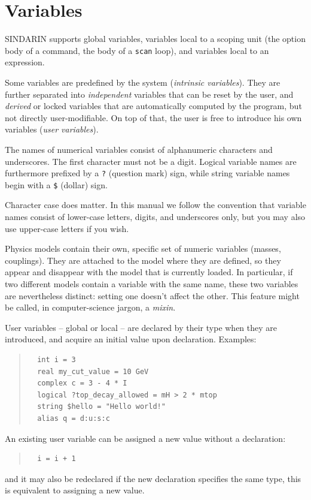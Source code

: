 \documentclass[12pt]{book}
\newcommand{\ttt}[1]{\texttt{#1}}
\begin{document}
\section{Variables}
\label{sec:variables}

SINDARIN supports global variables, variables local to a scoping unit (the
option body of a command, the body of a \ttt{scan} loop), and variables local
to an expression.

Some variables are predefined by the system (\emph{intrinsic
  variables}).  They are further separated into \emph{independent}
variables that can be reset by the user, and \emph{derived} or locked
variables that are automatically computed by the program, but not
directly user-modifiable.  On top of that, the user is free to
introduce his own variables (\emph{user variables}).

The names of numerical variables consist of alphanumeric characters and
underscores.  The first character must not be a digit.  Logical
variable names are furthermore prefixed by a
\ttt{?} (question mark) sign, while string variable names begin
with a \ttt{\$} (dollar) sign. 

Character case does matter.  In this manual we follow the
convention that variable names consist of lower-case letters,
digits, and underscores only, but you may also use upper-case
letters if you wish.

Physics models contain their own, specific set of numeric variables
(masses, couplings).  They are attached to the model where they are
defined, so they appear and disappear with the model that is currently
loaded.  In particular, if two different models contain a variable
with the same name, these two variables are nevertheless distinct:
setting one doesn't affect the other.  This feature might be called,
in computer-science jargon, a \emph{mixin}.

User variables -- global or local -- are declared by their type when they are
introduced, and acquire an initial value upon declaration.  Examples:
\begin{quote}
\begin{footnotesize}
\begin{verbatim}
  int i = 3
  real my_cut_value = 10 GeV
  complex c = 3 - 4 * I
  logical ?top_decay_allowed = mH > 2 * mtop
  string $hello = "Hello world!"
  alias q = d:u:s:c
\end{verbatim}
\end{footnotesize}
\end{quote}
An existing user variable can be assigned a new value without a declaration:
\begin{quote}
\begin{footnotesize}
\begin{verbatim}
  i = i + 1
\end{verbatim}
\end{footnotesize}
\end{quote}
and it may also be redeclared if the new declaration specifies the same type,
this is equivalent to assigning a new value.
\end{document}
